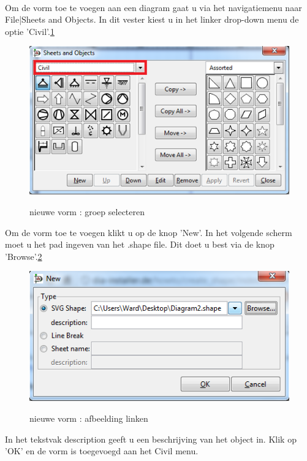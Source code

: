 \documentclass[12pt,a4paper]{report}
\begin{document}
\begin{flushleft}
\paragraph*{}
Om de vorm toe te voegen aan een diagram gaat u via het navigatiemenu naar File|Sheets and Objects. In dit vester kiest u in het linker drop-down menu de optie 'Civil'.\ref{shape_02}
\begin{figure}[H]
\includegraphics[scale=1]{images/shape_02.png}
\label{shape_02}
\centering
\vspace{-25pt}
\caption{nieuwe vorm : groep selecteren} 
\end{figure}
Om de vorm toe te voegen klikt u op de knop 'New'. In het volgende scherm moet u het pad ingeven van het .shape file. Dit doet u best via de knop 'Browse'.\ref{shape_03}
\begin{figure}[H]
\includegraphics[scale=1]{images/shape_03.png}
\label{shape_03}
\centering
\vspace{-10pt}
\caption{nieuwe vorm : afbeelding linken} 
\end{figure}
In het tekstvak description geeft u een beschrijving van het object in. Klik op 'OK' en de vorm is toegevoegd aan het Civil menu.

\end{flushleft}
\end{document}
